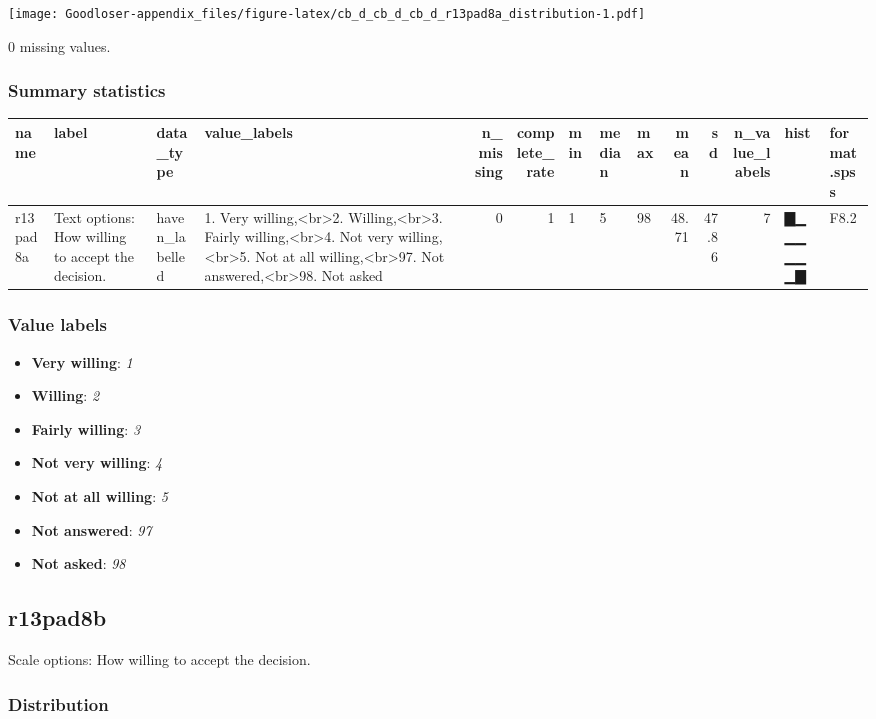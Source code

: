 \documentclass[
]{book}
\providecommand{\tightlist}{%
  \setlength{\itemsep}{0pt}\setlength{\parskip}{0pt}}
\begin{document}
\texttt{[image: Goodloser-appendix\_files/figure-latex/cb\_d\_cb\_d\_cb\_d\_r13pad8a\_distribution-1.pdf]}

0 missing values.

\hypertarget{r13pad8a_summary}{%
\subsubsection{Summary statistics}\label{r13pad8a_summary}}

\begin{tabular}{l|l|l|l|r|r|l|l|l|r|r|r|l|l}
\hline
name & label & data_type & value_labels & n_missing & complete_rate & min & median & max & mean & sd & n_value_labels & hist & format.spss\\
\hline
r13pad8a & Text options: How willing to accept the decision. & haven_labelled & 1. Very willing,<br>2. Willing,<br>3. Fairly willing,<br>4. Not very willing,<br>5. Not at all willing,<br>97. Not answered,<br>98. Not asked & 0 & 1 & 1 & 5 & 98 & 48.71 & 47.86 & 7 & ▇▁▁▁▁▁▁▇ & F8.2\\
\hline
\end{tabular}

\hypertarget{r13pad8a_labels}{%
\subsubsection{Value labels}\label{r13pad8a_labels}}

\begin{itemize}
\tightlist
\item
  \textbf{Very willing}: \emph{1}
\item
  \textbf{Willing}: \emph{2}
\item
  \textbf{Fairly willing}: \emph{3}
\item
  \textbf{Not very willing}: \emph{4}
\item
  \textbf{Not at all willing}: \emph{5}
\item
  \textbf{Not answered}: \emph{97}
\item
  \textbf{Not asked}: \emph{98}
\end{itemize}

\hypertarget{r13pad8b}{%
\subsection{r13pad8b}\label{r13pad8b}}

Scale options: How willing to accept the decision.

\hypertarget{r13pad8b_distribution}{%
\subsubsection{Distribution}\label{r13pad8b_distribution}}
\end{document}
